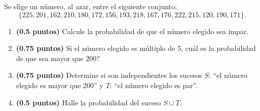 
Se elige un número, al azar, entre el siguiente conjunto:
\[
\{225,201,162,210,180,172,156,193,218,167,176,222,215,120,190,171\}.
\]
\begin{enumerate}[label=\alph*)]
\item \textbf{(0.5 puntos)} Calcule la probabilidad de que el número elegido sea impar.
\item \textbf{(0.75 puntos)} Si el número elegido es múltiplo de 5, \textquestiondown{}cuál es la probabilidad de que sea mayor que 200?
\item \textbf{(0.75 puntos)} Determine si son independientes los sucesos $S$: ``el número elegido es mayor que 200'' y $T$: ``el número elegido es par''.
\item \textbf{(0.5 puntos)} Halle la probabilidad del suceso $S\cup T$.
\end{enumerate}
